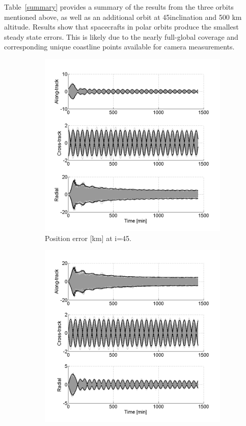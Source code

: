 \documentclass[]{aiaa-tc}%
\begin{document}
\clearpage
Table~\ref{summary} provides a summary of the results from the three orbits mentioned above, as well as an additional orbit at 45\degree inclination and 500 km altitude.  Results show that spacecrafts in polar orbits produce the smallest steady state errors.  This is likely due to the nearly full-global coverage and corresponding unique coastline points available for camera measurements.

\begin{figure}[h!]
	\centering
	\begin{subfigure}{.49\textwidth}
		\centering
		\includegraphics{MC_pos45}
		\caption{Position error [km] at i=45\degree.}
		\label{fig:mcpos45}
	\end{subfigure}%
	\begin{subfigure}{.49\textwidth} 
		\centering
		\includegraphics{MC_vel45}

\end{subfigure}
\end{figure}
\end{document}
